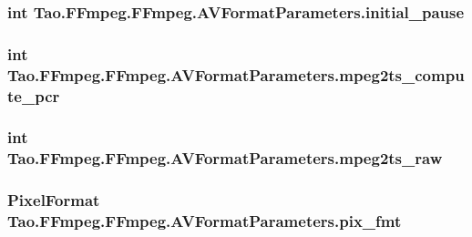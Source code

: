 \label{struct_tao_1_1_f_fmpeg_1_1_f_fmpeg_1_1_a_v_format_parameters_a1fd9ac926ac7eb6f74868e3177d6e633}
\hypertarget{struct_tao_1_1_f_fmpeg_1_1_f_fmpeg_1_1_a_v_format_parameters_a48e26f8205088d8f6d7dca3f42163f7e}{
\subsubsection[{initial\_\-pause}]{\setlength{\rightskip}{0pt plus 5cm}int {\bf Tao.FFmpeg.FFmpeg.AVFormatParameters.initial\_\-pause}}}
\label{struct_tao_1_1_f_fmpeg_1_1_f_fmpeg_1_1_a_v_format_parameters_a48e26f8205088d8f6d7dca3f42163f7e}
\hypertarget{struct_tao_1_1_f_fmpeg_1_1_f_fmpeg_1_1_a_v_format_parameters_a7174db019f41c8d5dceaf87988dddd28}{
\subsubsection[{mpeg2ts\_\-compute\_\-pcr}]{\setlength{\rightskip}{0pt plus 5cm}int {\bf Tao.FFmpeg.FFmpeg.AVFormatParameters.mpeg2ts\_\-compute\_\-pcr}}}
\label{struct_tao_1_1_f_fmpeg_1_1_f_fmpeg_1_1_a_v_format_parameters_a7174db019f41c8d5dceaf87988dddd28}
\hypertarget{struct_tao_1_1_f_fmpeg_1_1_f_fmpeg_1_1_a_v_format_parameters_aa3c90ab1218c8888c65561a94e0e9e51}{
\subsubsection[{mpeg2ts\_\-raw}]{\setlength{\rightskip}{0pt plus 5cm}int {\bf Tao.FFmpeg.FFmpeg.AVFormatParameters.mpeg2ts\_\-raw}}}
\label{struct_tao_1_1_f_fmpeg_1_1_f_fmpeg_1_1_a_v_format_parameters_aa3c90ab1218c8888c65561a94e0e9e51}
\hypertarget{struct_tao_1_1_f_fmpeg_1_1_f_fmpeg_1_1_a_v_format_parameters_acdac0b98658feb16c9f5683626469ac5}{
\subsubsection[{pix\_\-fmt}]{\setlength{\rightskip}{0pt plus 5cm}PixelFormat {\bf Tao.FFmpeg.FFmpeg.AVFormatParameters.pix\_\-fmt}}}
